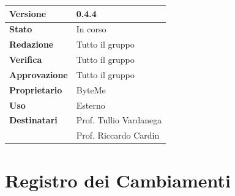 \documentclass[11pt,a4paper]{article}
\begin{document}
\begin{titlepage}
    \begin{table}[H]
        \centering
        \begin{tabular}{|l|p{5cm}|}
            \hline
            \textbf{Versione} & 0.4.4 \\
            \hline
            \textbf{Stato} & In corso \\
            \hline
            \textbf{Redazione} & Tutto il gruppo \\
            \hline
            \textbf{Verifica} & Tutto il gruppo \\
            \hline
            \textbf{Approvazione} & Tutto il gruppo \\
            \hline
            \textbf{Proprietario} & ByteMe \\
            \hline
            \textbf{Uso} & Esterno \\
            \hline
            \textbf{Destinatari} & Prof. Tullio Vardanega \\ & Prof. Riccardo Cardin \\
            \hline
        \end{tabular}
    \end{table}
    
    \vfill
\end{titlepage}

\thispagestyle{empty}
\section*{Registro dei Cambiamenti}
\end{document}
